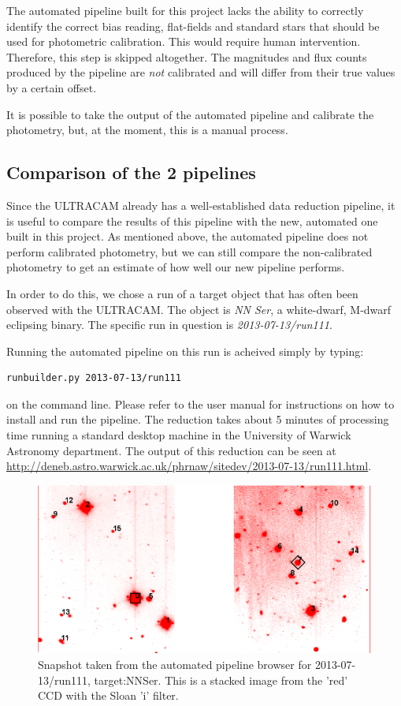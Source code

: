 The automated pipeline built for this project lacks the ability to correctly identify the correct bias reading, flat-fields and standard stars that should be used for photometric calibration. This would require human intervention. Therefore, this step is skipped altogether. The magnitudes and flux counts produced by the pipeline are \emph{not} calibrated and will differ from their true values by a certain offset.

It is possible to take the output of the automated pipeline and calibrate the photometry, but, at the moment, this is a manual process. 

\subsection{Comparison of the 2 pipelines}
Since the ULTRACAM already has a well-established data reduction pipeline, it is useful to compare the results of this pipeline with the new, automated one built in this project. As mentioned above, the automated pipeline does not perform calibrated photometry, but we can still compare the non-calibrated photometry to get an estimate of how well our new pipeline performs.

In order to do this, we chose a run of a target object that has often been observed with the ULTRACAM. The object is \emph{NN Ser}, a white-dwarf, M-dwarf eclipsing binary. The specific run in question is \emph{2013-07-13/run111}.

Running the automated pipeline on this run is acheived simply by typing: \begin{verbatim}runbuilder.py 2013-07-13/run111 \end{verbatim} on the command line. Please refer to the user manual \cite{chap:usermanual} for instructions on how to install and run the pipeline.  The reduction takes about 5 minutes of processing time running a standard desktop machine in the University of Warwick Astronomy department. The output of this reduction can be seen at \url{http://deneb.astro.warwick.ac.uk/phrnaw/sitedev/2013-07-13/run111.html}.

\begin{figure}[!h]
\centering
\includegraphics[width=120mm]{images/2013-07-13-run111-r-withlabels.png}
\caption{Snapshot taken from the automated pipeline browser for 2013-07-13/run111, target:NNSer. This is a stacked image from the 'red' CCD with the Sloan 'i' filter. }
\label{fig:nnserfield}
\end{figure}

